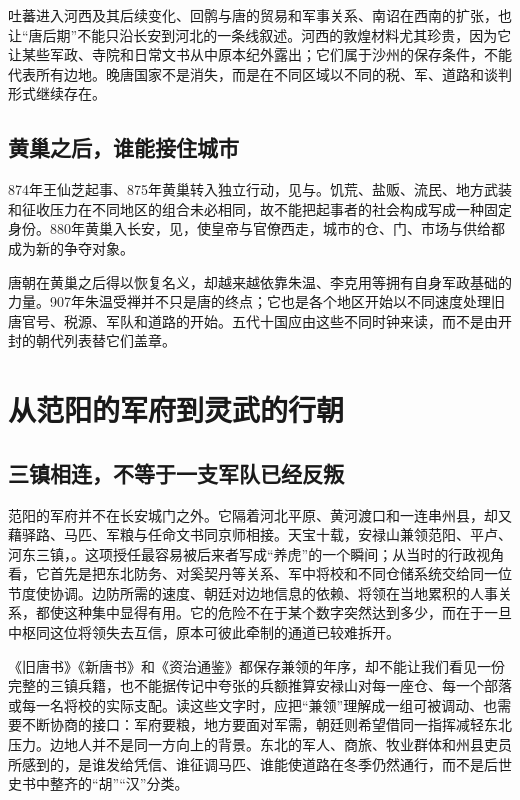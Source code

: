 吐蕃进入河西及其后续变化、回鹘与唐的贸易和军事关系、南诏在西南的扩张，也让“唐后期”不能只沿长安到河北的一条线叙述。河西的敦煌材料尤其珍贵，因为它让某些军政、寺院和日常文书从中原本纪外露出；它们属于沙州的保存条件，不能代表所有边地。晚唐国家不是消失，而是在不同区域以不同的税、军、道路和谈判形式继续存在。

\subsection{黄巢之后，谁能接住城市}
874年王仙芝起事、875年黄巢转入独立行动，见与。饥荒、盐贩、流民、地方武装和征收压力在不同地区的组合未必相同，故不能把起事者的社会构成写成一种固定身份。880年黄巢入长安，见，使皇帝与官僚西走，城市的仓、门、市场与供给都成为新的争夺对象。

唐朝在黄巢之后得以恢复名义，却越来越依靠朱温、李克用等拥有自身军政基础的力量。907年朱温受禅并不只是唐的终点；它也是各个地区开始以不同速度处理旧唐官号、税源、军队和道路的开始。五代十国应由这些不同时钟来读，而不是由开封的朝代列表替它们盖章。

\section{从范阳的军府到灵武的行朝}

\subsection{三镇相连，不等于一支军队已经反叛}
范阳的军府并不在长安城门之外。它隔着河北平原、黄河渡口和一连串州县，却又藉驿路、马匹、军粮与任命文书同京师相接。天宝十载，安禄山兼领范阳、平卢、河东三镇，。这项授任最容易被后来者写成“养虎”的一个瞬间；从当时的行政视角看，它首先是把东北防务、对奚契丹等关系、军中将校和不同仓储系统交给同一位节度使协调。边防所需的速度、朝廷对边地信息的依赖、将领在当地累积的人事关系，都使这种集中显得有用。它的危险不在于某个数字突然达到多少，而在于一旦中枢同这位将领失去互信，原本可彼此牵制的通道已较难拆开。

《旧唐书》《新唐书》和《资治通鉴》都保存兼领的年序，却不能让我们看见一份完整的三镇兵籍，也不能据传记中夸张的兵额推算安禄山对每一座仓、每一个部落或每一名将校的实际支配。读这些文字时，应把“兼领”理解成一组可被调动、也需要不断协商的接口：军府要粮，地方要面对军需，朝廷则希望借同一指挥减轻东北压力。边地人并不是同一方向上的背景。东北的军人、商旅、牧业群体和州县吏员所感到的，是谁发给凭信、谁征调马匹、谁能使道路在冬季仍然通行，而不是后世史书中整齐的“胡”“汉”分类。

